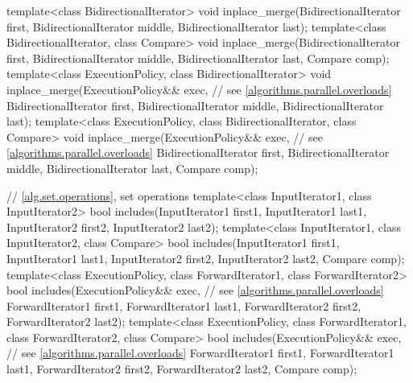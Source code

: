 \begin{codeblock}
{  template<class BidirectionalIterator>
    void inplace_merge(BidirectionalIterator first,
                       BidirectionalIterator middle,
                       BidirectionalIterator last);
  template<class BidirectionalIterator, class Compare>
    void inplace_merge(BidirectionalIterator first,
                       BidirectionalIterator middle,
                       BidirectionalIterator last, Compare comp);
  template<class ExecutionPolicy, class BidirectionalIterator>
    void inplace_merge(ExecutionPolicy&& exec, // see \ref{algorithms.parallel.overloads}
                       BidirectionalIterator first,
                       BidirectionalIterator middle,
                       BidirectionalIterator last);
  template<class ExecutionPolicy, class BidirectionalIterator, class Compare>
    void inplace_merge(ExecutionPolicy&& exec, // see \ref{algorithms.parallel.overloads}
                       BidirectionalIterator first,
                       BidirectionalIterator middle,
                       BidirectionalIterator last, Compare comp);

  // \ref{alg.set.operations}, set operations
  template<class InputIterator1, class InputIterator2>
    bool includes(InputIterator1 first1, InputIterator1 last1,
                  InputIterator2 first2, InputIterator2 last2);
  template<class InputIterator1, class InputIterator2, class Compare>
    bool includes(InputIterator1 first1, InputIterator1 last1,
                  InputIterator2 first2, InputIterator2 last2, Compare comp);
  template<class ExecutionPolicy, class ForwardIterator1, class ForwardIterator2>
    bool includes(ExecutionPolicy&& exec, // see \ref{algorithms.parallel.overloads}
                  ForwardIterator1 first1, ForwardIterator1 last1,
                  ForwardIterator2 first2, ForwardIterator2 last2);
  template<class ExecutionPolicy, class ForwardIterator1, class ForwardIterator2,
           class Compare>
    bool includes(ExecutionPolicy&& exec, // see \ref{algorithms.parallel.overloads}
                  ForwardIterator1 first1, ForwardIterator1 last1,
                  ForwardIterator2 first2, ForwardIterator2 last2, Compare comp);

}
\end{codeblock}
